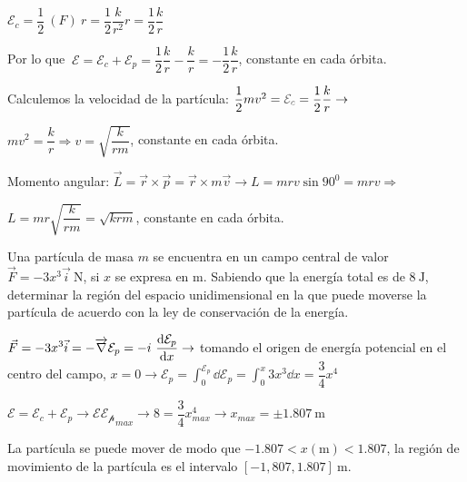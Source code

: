 $\displaystyle \mathcal E_c=\dfrac 1 2 \ (F) \ r=\dfrac 1 2 \dfrac k {r^2} r=\dfrac 1 2 \dfrac k r$

Por lo que $\ \mathcal E=\mathcal E_c+\mathcal E_p=\dfrac 1 2 \dfrac k r - \dfrac k r = - \dfrac 1 2 \dfrac k r$, constante en cada órbita.

Calculemos la velocidad de la partícula: $\dfrac 1 2 m v^2 = \textcolor{gris}{\mathcal E_c}=\dfrac 1 2 \dfrac k r \to $

$\displaystyle mv^2=\dfrac k r \Rightarrow v=\sqrt{\dfrac k {rm}}$, constante en cada órbita.

Momento angular: $\vec L=\vec r \times \vec p=\vec r \times m \vec v \to L=mrv \sin 90^0=mrv \Rightarrow$

$L=mr\sqrt{\dfrac k{rm}}=\sqrt{krm}$, constante en cada órbita.

\begin{prob}
Una partícula de masa $m$ se encuentra en un campo central de valor $\vec F=-3x^3\vec i \ \mathrm{N}$, si $x$ se expresa en $\mathrm{m}$. Sabiendo que la energía total es de $8\ \mathrm{J}$, determinar la región del espacio unidimensional en la que puede moverse la partícula de acuerdo con la ley de conservación de la energía.	
\end{prob}
$\displaystyle \vec F=-3x^3\vec i =-\overrightarrow{\nabla} \mathcal E_p=-i\ \dv{\mathcal E_p}{x} \to$ tomando el origen de energía potencial en el centro del campo, $x=0 \to \displaystyle \mathcal E_p=\int_0^{\mathcal E_p} \dd \mathcal E_p=\int_0^x 3x^3 \dd x=\dfrac 3 4 x^4$

$\mathcal E=\mathcal E_c+\mathcal E_p \to \mathcal E\mathcal {E_p}_{max} \to 8=\dfrac 3 4 x_{max}^4 \to x_{max}=\pm 1.807\ \mathrm{m}$

La partícula se puede mover de modo que  $-1.807 < x (\mathrm{m}) < 1.807$, la región de movimiento de la partícula es el intervalo $[-1,807,1.807]\ \mathrm{m}$. 



